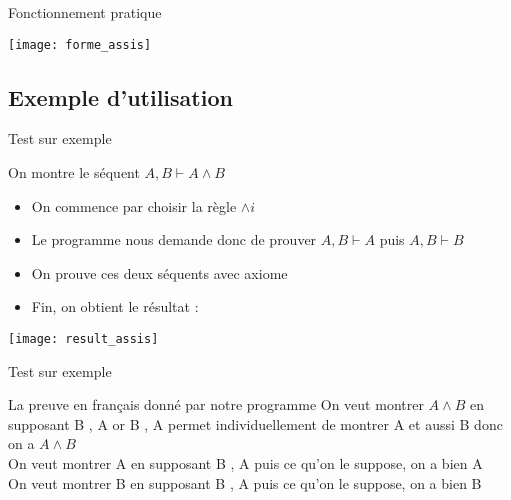 \documentclass{beamer}
\begin{document}
\begin{frame}{Fonctionnement pratique}

    \begin{minipage}{1.05\textwidth}
        \centering
        \texttt{[image: forme\_assis]}
    \end{minipage} 
    
    
\end{frame}

\subsection{Exemple d'utilisation}


\begin{frame}{Test sur exemple}
    \begin{block}{On montre le séquent {$A , B \vdash A \land B$}}
    \begin{itemize}
        \item On commence par choisir la règle {$\land i$}
        \item Le programme nous demande donc de prouver {$A , B \vdash A$} puis {$A, B \vdash B$}
        \item On prouve ces deux séquents avec axiome 
        \item Fin, on obtient le résultat : 
    \end{itemize}
  
    \end{block}

    \begin{minipage}{1.05\textwidth}
        \centering
        \texttt{[image: result\_assis]}
    \end{minipage} 
\end{frame}

\begin{frame}{Test sur exemple}
    \begin{block}{La preuve en français donné par notre programme}
        On veut montrer {$A \land B$} en supposant B , A or B , A permet individuellement de montrer A et aussi B donc on a {$A \land B$} \\
        On veut montrer A en supposant B ,  A 
        puis ce qu'on le suppose, on a bien A \\
        On veut montrer B en supposant B ,  A 
        puis ce qu'on le suppose, on a bien B 


        
    \end{block}
    
\end{frame}
\end{document}
